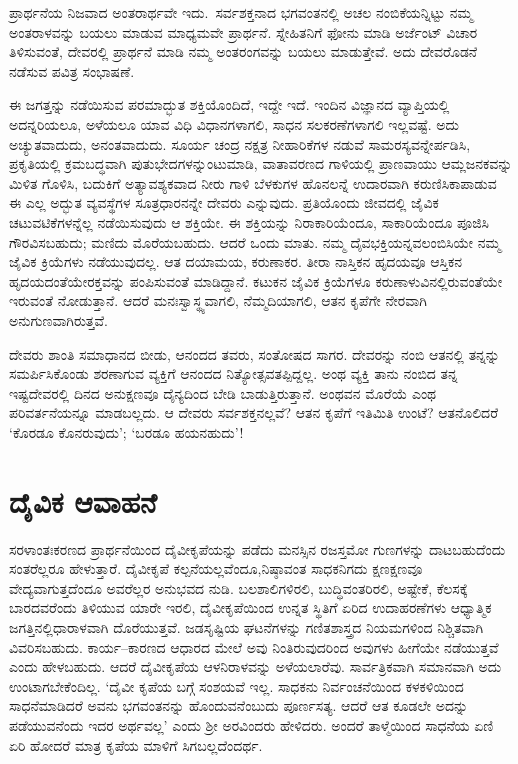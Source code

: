
ಪ್ರಾರ್ಥನೆಯ ನಿಜವಾದ ಅಂತರಾರ್ಥವೇ ಇದು.\ ಸರ್ವಶಕ್ತನಾದ ಭಗವಂತನಲ್ಲಿ ಅಚಲ ನಂಬಿಕೆ\-ಯನ್ನಿಟ್ಟು ನಮ್ಮ ಅಂತರಾಳವನ್ನು ಬಯಲು ಮಾಡುವ ಮಾಧ್ಯಮವೇ ಪ್ರಾರ್ಥನೆ. ಸ್ನೇಹಿತನಿಗೆ ಫೋನು ಮಾಡಿ ಅರ್ಜೆಂಟ್ ವಿಚಾರ ತಿಳಿಸುವಂತೆ, ದೇವರಲ್ಲಿ ಪ್ರಾರ್ಥನೆ ಮಾಡಿ ನಮ್ಮ ಅಂತರಂಗವನ್ನು ಬಯಲು ಮಾಡುತ್ತೇವೆ. ಅದು ದೇವರೊಡನೆ ನಡೆಸುವ ಪವಿತ್ರ ಸಂಭಾಷಣೆ.

ಈ ಜಗತ್ತನ್ನು ನಡೆಯಿಸುವ ಪರಮಾದ್ಭುತ ಶಕ್ತಿಯೊಂದಿದೆ, ಇದ್ದೇ ಇದೆ. ಇಂದಿನ ವಿಜ್ಞಾನದ ವ್ಯಾಪ್ತಿಯಲ್ಲಿ ಅದನ್ನರಿಯಲೂ, ಅಳೆಯಲೂ ಯಾವ ವಿಧಿ ವಿಧಾನಗಳಾಗಲಿ, ಸಾಧನ ಸಲಕರಣೆ\-ಗಳಾಗಲಿ ಇಲ್ಲವಷ್ಟೆ. ಅದು ಅಚ್ಯುತವಾದುದು, ಅನಂತವಾದುದು. ಸೂರ್ಯ ಚಂದ್ರ ನಕ್ಷತ್ರ ನೀಹಾರಿಕೆಗಳ ನಡುವೆ ಸಾಮರಸ್ಯವನ್ನೇರ್ಪಡಿಸಿ, ಪ್ರಕೃತಿಯಲ್ಲಿ ಕ್ರಮಬದ್ಧವಾಗಿ ಪುತುಭೇದ\-ಗಳನ್ನುಂಟುಮಾಡಿ, ವಾತಾವರಣದ ಗಾಳಿಯಲ್ಲಿ ಪ್ರಾಣವಾಯು ಆಮ್ಲಜನಕವನ್ನು ಮಿಳಿತ ಗೊಳಿಸಿ, ಬದುಕಿಗೆ ಅತ್ಯಾವಶ್ಯಕವಾದ ನೀರು ಗಾಳಿ ಬೆಳಕುಗಳ ಹೊನಲನ್ನೆ ಉದಾರವಾಗಿ ಕರುಣಿಸಿ\break ಕಾಪಾಡುವ ಈ ಎಲ್ಲ ಅದ್ಭುತ ವ್ಯವಸ್ಥೆಗಳ ಸೂತ್ರಧಾರನನ್ನೇ ದೇವರು ಎನ್ನುವುದು. ಪ್ರತಿಯೊಂದು ಜೀವದಲ್ಲಿ ಜೈವಿಕ ಚಟುವಟಿಕೆಗಳನ್ನೆಲ್ಲ ನಡೆಯಿಸುವುದು ಆ ಶಕ್ತಿಯೇ. ಈ ಶಕ್ತಿಯನ್ನು ನಿರಾಕಾರಿ\-ಯೆಂದೂ, ಸಾಕಾರಿಯೆಂದೂ ಪೂಜಿಸಿ ಗೌರವಿಸಬಹುದು; ಮಣಿದು ಮೊರೆಯಬಹುದು. ಆದರೆ ಒಂದು ಮಾತು. ನಮ್ಮ ದೈವಭಕ್ತಿಯನ್ನವಲಂಬಿಸಿಯೇ ನಮ್ಮ ಜೈವಿಕ ಕ್ರಿಯೆಗಳು ನಡೆಯುವುದಲ್ಲ. ಆತ ದಯಾಮಯ, ಕರುಣಾಕರ. ತೀರಾ ನಾಸ್ತಿಕನ ಹೃದಯವೂ ಆಸ್ತಿಕನ ಹೃದಯದಂತೆಯೇ\break ರಕ್ತವನ್ನು ಪಂಪಿಸುವಂತೆ ಮಾಡಿದ್ದಾನೆ. ಕಟುಕನ ಜೈವಿಕ ಕ್ರಿಯೆಗಳೂ ಕರುಣಾಳುವಿ\-ನಲ್ಲಿರು\-ವಂತೆಯೇ ಇರುವಂತೆ ನೋಡುತ್ತಾನೆ. ಆದರೆ ಮನಃಸ್ವಾಸ್ಥ್ಯವಾಗಲಿ, ನೆಮ್ಮದಿಯಾಗಲಿ, ಆತನ ಕೃಪೆಗೇ ನೇರವಾಗಿ ಅನುಗುಣವಾಗಿರುತ್ತವೆ.

ದೇವರು ಶಾಂತಿ ಸಮಾಧಾನದ ಬೀಡು, ಆನಂದದ ತವರು, ಸಂತೋಷದ ಸಾಗರ. ದೇವರನ್ನು ನಂಬಿ ಆತನಲ್ಲಿ ತನ್ನನ್ನು ಸಮರ್ಪಿಸಿಕೊಂಡು ಶರಣಾಗುವ ವ್ಯಕ್ತಿಗೆ ಆನಂದದ ನಿತ್ಯೋತ್ಸವ\break ತಪ್ಪಿದ್ದಲ್ಲ. ಅಂಥ ವ್ಯಕ್ತಿ ತಾನು ನಂಬಿದ ತನ್ನ ಇಷ್ಟದೇವರಲ್ಲಿ ದಿನದ ಅನುಕ್ಷಣವೂ ದೈನ್ಯದಿಂದ ಬೇಡಿ ಬಾಡುತ್ತಿರುತ್ತಾನೆ. ಅಂಥವನ ಮೊರೆಯೆ ಎಂಥ ಪರಿವರ್ತನೆಯನ್ನೂ ಮಾಡಬಲ್ಲದು. ಆ ದೇವರು ಸರ್ವಶಕ್ತನಲ್ಲವೆ? ಆತನ ಕೃಪೆಗೆ ಇತಿಮಿತಿ ಉಂಟೆ? ಆತನೊಲಿದರೆ ‘ಕೊರಡೂ ಕೊನರುವುದು’; ‘ಬರಡೂ ಹಯನಹುದು’!


\section*{ದೈವಿಕ ಆವಾಹನೆ}


ಸರಳಾಂತಃಕರಣದ ಪ್ರಾರ್ಥನೆಯಿಂದ ದೈವೀಕೃಪೆಯನ್ನು ಪಡೆದು ಮನಸ್ಸಿನ ರಜಸ್ತಮೋ ಗುಣಗಳನ್ನು ದಾಟಬಹುದೆಂದು ಸಂತರೆಲ್ಲರೂ ಹೇಳುತ್ತಾರೆ. ದೈವೀಕೃಪೆ ಕಲ್ಪನೆಯಲ್ಲವೆಂದೂ,\break ನಿಷ್ಠಾವಂತ ಸಾಧಕನಿಗದು ಕ್ಷಣಕ್ಷಣವೂ ವೇದ್ಯವಾಗುತ್ತದೆಂದೂ ಅವರೆಲ್ಲರ ಅನುಭವದ ನುಡಿ. ಬಲಶಾಲಿಗಳಿರಲಿ, ಬುದ್ಧಿವಂತರಿರಲಿ, ಅಷ್ಟೇಕೆ, ಕೆಲಸಕ್ಕೆ ಬಾರದವರೆಂದು ತಿಳಿಯುವ ಯಾರೇ ಇರಲಿ, ದೈವೀಕೃಪೆಯಿಂದ ಉನ್ನತ ಸ್ಥಿತಿಗೆ ಏರಿದ ಉದಾಹರಣೆಗಳು ಆಧ್ಯಾತ್ಮಿಕ ಜಗತ್ತಿನಲ್ಲಿ\break ಧಾರಾಳವಾಗಿ ದೊರೆಯುತ್ತವೆ. ಜಡಸೃಷ್ಟಿಯ ಘಟನೆಗಳನ್ನು ಗಣಿತಶಾಸ್ತ್ರದ ನಿಯಮಗಳಿಂದ ನಿಶ್ಚಿತವಾಗಿ ವಿವರಿಸಬಹುದು. ಕಾರ್ಯ–ಕಾರಣದ ಆಧಾರದ ಮೇಲೆ ಅವು ನಿಂತಿರುವುದರಿಂದ ಅವುಗಳು ಹೀಗೆಯೇ ನಡೆಯುತ್ತವೆ ಎಂದು ಹೇಳಬಹುದು. ಆದರೆ ದೈವೀಕೃಪೆಯ ಆಳನಿರಾಳವನ್ನು ಅಳೆಯಲಾರೆವು. ಸಾರ್ವತ್ರಿಕವಾಗಿ ಸಮಾನವಾಗಿ ಅದು ಉಂಟಾಗಬೇಕೆಂದಿಲ್ಲ. ‘ದೈವೀ ಕೃಪೆಯ ಬಗ್ಗೆ ಸಂಶಯವೆ ಇಲ್ಲ. ಸಾಧಕನು ನಿರ್ವಂಚನೆಯಿಂದ ಕಳಕಳಿಯಿಂದ ಸಾಧನೆ\break ಮಾಡಿದರೆ ಅವನು ಭಗವಂತನನ್ನು ಹೊಂದುವನೆಂಬುದು ಪೂರ್ಣಸತ್ಯ. ಆದರೆ ಆತ ಕೂಡಲೇ ಅದನ್ನು ಪಡೆಯುವನೆಂದು ಇದರ ಅರ್ಥವಲ್ಲ’ ಎಂದು ಶ‍್ರೀ ಅರವಿಂದರು ಹೇಳಿದರು. ಅಂದರೆ ತಾಳ್ಮೆಯಿಂದ ಸಾಧನೆಯ ಏಣಿ ಏರಿ ಹೋದರೆ ಮಾತ್ರ ಕೃಪೆಯ ಮಾಳಿಗೆ ಸಿಗಬಲ್ಲ\-ದೆಂದರ್ಥ.

